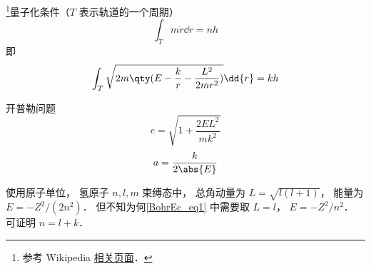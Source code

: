 
\begin{issues}
\issueDraft
\end{issues}

\footnote{参考 Wikipedia \href{https://en.wikipedia.org/wiki/Old_quantum_theory}{相关页面}．}量子化条件（$T$ 表示轨道的一个周期）
\begin{equation}
\int_T m\dot r \dd{r} = nh
\end{equation}
即
\begin{equation}\label{BohrEc_eq1}
\int_T \sqrt{2m\qty(E - \frac{k}{r} - \frac{L^2}{2mr^2})} \dd{r} = kh
\end{equation}

开普勒问题
\begin{equation}
e = \sqrt{1 + \frac{2EL^2}{mk^2}}
\end{equation}
\begin{equation}
a = \frac{k}{2\abs{E}}
\end{equation}

使用原子单位， 氢原子 $n,l,m$ 束缚态中， 总角动量为 $L = \sqrt{l(l+1)}$， 能量为 $E = -Z^2/(2n^2)$． 但不知为何\autoref{BohrEc_eq1} 中需要取 $L = l$， $E = -Z^2/n^2$． 可证明 $n = l + k$．
